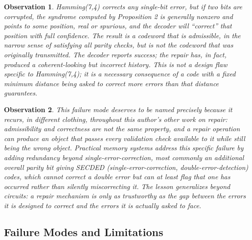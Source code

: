 \documentclass[12pt]{article}
\newtheorem{observation}{Observation}
\begin{document}
\begin{observation}
Hamming(7,4) corrects any single-bit error, but if two bits are corrupted, the syndrome computed by Proposition 2 is generally nonzero and points to some position, real or spurious, and the decoder will ``correct'' that position with full confidence. The result is a codeword that is admissible, in the narrow sense of satisfying all parity checks, but is not the codeword that was originally transmitted. The decoder reports success; the repair has, in fact, produced a coherent-looking but incorrect history. This is not a design flaw specific to Hamming(7,4); it is a necessary consequence of a code with a fixed minimum distance being asked to correct more errors than that distance guarantees.
\end{observation}

\begin{observation}
This failure mode deserves to be named precisely because it recurs, in different clothing, throughout this author's other work on repair: admissibility and correctness are not the same property, and a repair operation can produce an object that passes every validation check available to it while still being the wrong object. Practical memory systems address this specific failure by adding redundancy beyond single-error-correction, most commonly an additional overall parity bit giving SECDED (single-error-correction, double-error-detection) codes, which cannot correct a double error but can at least flag that one has occurred rather than silently miscorrecting it. The lesson generalizes beyond circuits: a repair mechanism is only as trustworthy as the gap between the errors it is designed to correct and the errors it is actually asked to face.
\end{observation}

\subsection{Failure Modes and Limitations}
\end{document}
